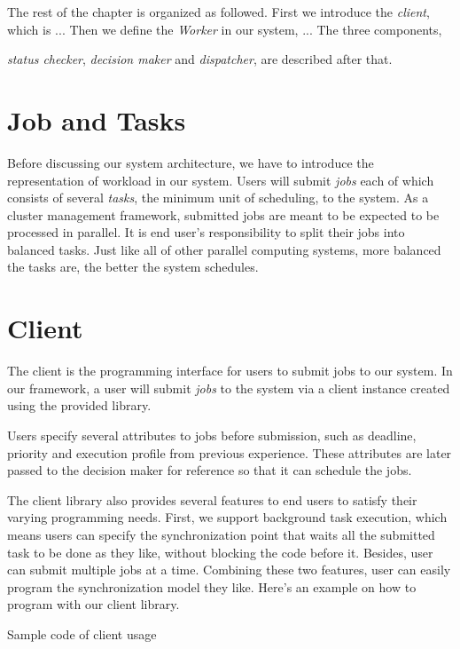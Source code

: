 The rest of the chapter is organized as followed.  
First we introduce the \emph{client}, which is ...
Then we define the \emph{Worker} in our system, ...
The three components, { \emph{status checker}, \emph{decision maker} and
\emph{dispatcher}, are described after that.

\section{Job and Tasks}

Before discussing our system architecture, we have to introduce the
representation of workload in our system.
Users will submit \emph{jobs} each of which consists of several
\emph{tasks}, the minimum unit of scheduling, to the system.
As a cluster management framework, submitted jobs are meant to be
expected to be processed in parallel.
It is end user's responsibility to split their jobs into balanced tasks.
Just like all of other parallel computing systems, more balanced the
tasks are, the better the system schedules.

\section{Client}

The client is the programming interface for users to submit jobs to our
system.
In our framework, a user will submit \emph{jobs} to the system via a
client instance created using the provided library.

Users specify several attributes to jobs before submission, such as
deadline, priority and execution profile from previous experience.
These attributes are later passed to the decision maker for reference so
that it can schedule the jobs.

The client library also provides several features to end users to
satisfy their varying programming needs.
First, we support background task execution, which means users can
specify the synchronization point that waits all the submitted task to
be done as they like, without blocking the code before it.
Besides, user can submit multiple jobs at a time.
Combining these two features, user can easily program the
synchronization model they like.
Here's an example on how to program with our client library.

\begin{spacing}{1.0}
  \begin{Example Code}
    
    \caption{Sample code of client usage}
  \end{Example Code}
\end{spacing}

}
